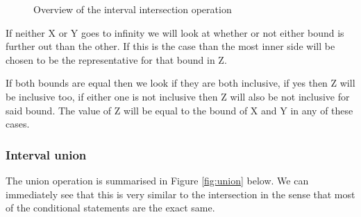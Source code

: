\documentclass[12pt]{article}
\begin{document}
\begin{figure}
	\caption{Overview of the interval intersection operation}
	\label{fig:intersection}
\end{figure}

If neither X or Y goes to infinity we will look at whether or not either bound is further out than the other. If this is the case than the most inner side will be chosen to be the representative for that bound in Z. 

If both bounds are equal then we look if they are both inclusive, if yes then Z will be inclusive too, if either one is not inclusive then Z will also be not inclusive for said bound. The value of Z will be equal to the bound of X and Y in any of these cases.

\subsubsection{Interval union}
The union operation is summarised in Figure \ref{fig:union} below. We can immediately see that this is very similar to the intersection in the sense that most of the conditional statements are the exact same. 
\end{document}
